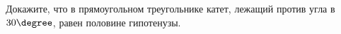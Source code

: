 \begin{ex}
	\begin{condition}
		Докажите, что в прямоугольном треугольнике катет, лежащий против угла в \( 30\degree \), равен половине гипотенузы.
	\end{condition}
\end{ex}